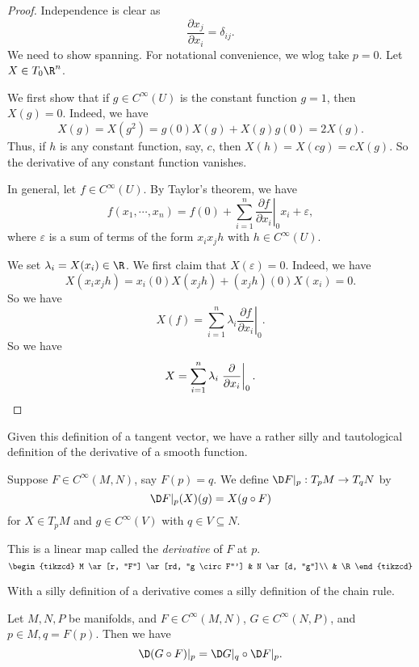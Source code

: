 \documentclass[a4paper]{article}
\begin{document}
\begin{proof}
  Independence is clear as
  \[
    \frac{\partial x_j}{\partial x_i} = \delta_{ij}.
  \]
  We need to show spanning. For notational convenience, we wlog take $p = 0$. Let $X \in T_0 \R^n$.

  We first show that if $g \in C^\infty(U)$ is the constant function $g = 1$, then $X(g) = 0$. Indeed, we have
  \[
    X(g) = X(g^2) = g(0) X(g) + X(g) g(0) = 2 X(g).
  \]
  Thus, if $h$ is any constant function, say, $c$, then $X(h) = X(cg) = c X(g)$. So the derivative of any constant function vanishes.

  In general, let $f \in C^\infty(U)$. By Taylor's theorem, we have
  \[
    f(x_1, \cdots, x_n) = f(0) + \sum_{i = 1}^n \left.\frac{\partial f}{\partial x_i}\right|_0 x_i + \varepsilon,
  \]
  where $\varepsilon$ is a sum of terms of the form $x_i x_j h$ with $h \in C^\infty(U)$.

  We set $\lambda_i = X(x_i) \in \R$. We first claim that $X(\varepsilon) = 0$. Indeed, we have
  \[
    X (x_i x_j h) = x_i(0) X(x_j h) + (x_jh)(0) X(x_i) = 0.
  \]
  So we have
  \[
    X(f) = \sum_{i = 1}^n \lambda_i \left.\frac{\partial f}{\partial x_i}\right|_0.
  \]
  So we have
  \[
    X = \sum_{i = 1}^n \lambda_i \left.\frac{\partial}{\partial x_i}\right|_0. \qedhere
  \]
\end{proof}

Given this definition of a tangent vector, we have a rather silly and tautological definition of the derivative of a smooth function.
\begin{defi}[Derivative]
  Suppose $F \in C^\infty(M, N)$, say $F(p) = q$. We define $\D F|_p: T_p M \to T_q N$ by
  \[
    \D F|_p(X)(g) = X(g \circ F)
  \]
  for $X \in T_pM$ and $g \in C^\infty(V)$ with $q \in V \subseteq N$.

  This is a linear map called the \emph{derivative} of $F$ at $p$.
  \[
    \begin{tikzcd}
      M \ar[r, "F"] \ar[rd, "g \circ F"'] & N \ar[d, "g"]\\
      & \R
    \end{tikzcd}
  \]
\end{defi}

With a silly definition of a derivative comes a silly definition of the chain rule.
\begin{prop}
  Let $M, N, P$ be manifolds, and $F \in C^\infty(M, N)$, $G \in C^\infty(N, P)$, and $p \in M, q = F(p)$. Then we have
  \[
    \D(G \circ F)|_p = \D G|_q \circ \D F|_p.
  \]
\end{prop}
\end{document}
